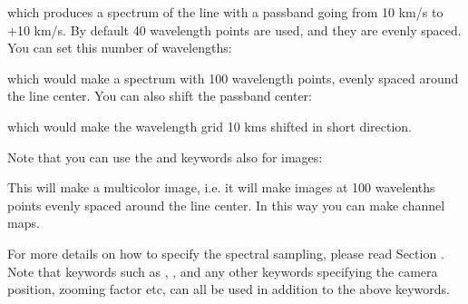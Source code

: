 \documentclass[letterpaper,10pt,english]{sphinxmanual}
\begin{document}
which produces a spectrum of the line with a passband going from \sphinxhyphen{}10 km/s to
+10 km/s. By default 40 wavelength points are used, and they are evenly
spaced. You can set this number of wavelengths:

\begin{sphinxVerbatim}[commandchars=\\\{\}]
       
\end{sphinxVerbatim}

which would make a spectrum with 100 wavelength points, evenly spaced around
the line center. You can also shift the passband center:

\begin{sphinxVerbatim}[commandchars=\\\{\}]
         
\end{sphinxVerbatim}

which would make the wavelength grid 10 kms shifted in short direction.

Note that you can use the  and  keywords also for
images:

\begin{sphinxVerbatim}[commandchars=\\\{\}]
       
\end{sphinxVerbatim}

This will make a multi\sphinxhyphen{}color image, i.e. it will make images at 100 wavelenths
points evenly spaced around the line center. In this way you can make channel
maps.

For more details on how to specify the spectral sampling, please read Section
{\hyperref[\detokenize{imagesspectra:sec-set-camera-frequencies}]{}}. Note that keywords such as , ,
and any other keywords specifying the camera position, zooming factor etc, can
all be used in addition to the above keywords.
\end{document}
